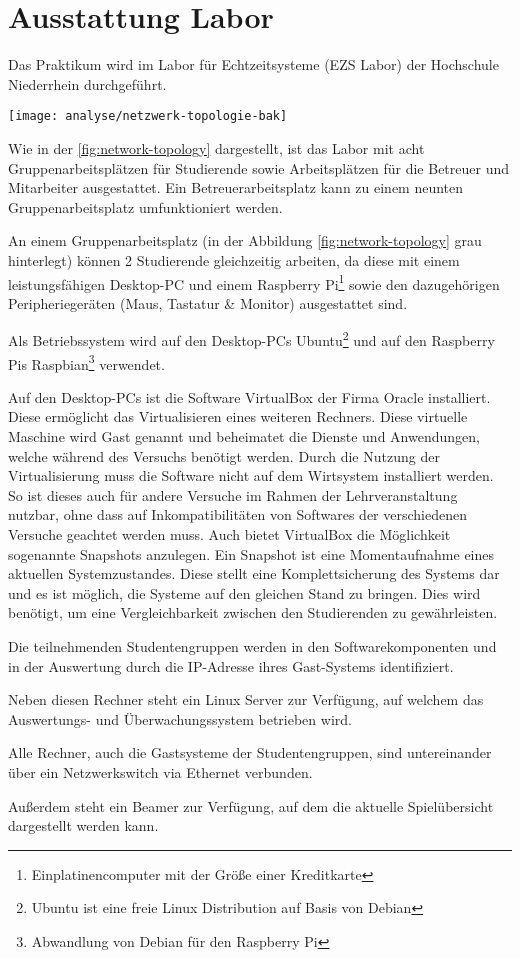 \section{Ausstattung Labor}
\label{sec:Ausstattung_Labor}

Das Praktikum wird im Labor für Echtzeitsysteme (EZS Labor) der Hochschule Niederrhein durchgeführt.

\begin{center}
	\texttt{[image: analyse/netzwerk-topologie-bak]}
	\label{fig:network-topology}
\end{center}

Wie in der \autoref{fig:network-topology} dargestellt, ist das Labor mit acht Gruppenarbeitsplätzen für Studierende sowie Arbeitsplätzen für die Betreuer und Mitarbeiter ausgestattet. Ein Betreuerarbeitsplatz kann zu einem neunten Gruppenarbeitsplatz umfunktioniert werden.

An einem Gruppenarbeitsplatz (in der Abbildung \ref{fig:network-topology} grau hinterlegt) können 2 Studierende gleichzeitig arbeiten, da diese mit einem leistungsfähigen Desktop-PC und einem Raspberry Pi\footnote{Einplatinencomputer mit der Größe einer Kreditkarte} sowie den dazugehörigen Peripheriegeräten (Maus, Tastatur \& Monitor) ausgestattet sind.

Als Betriebssystem wird auf den Desktop-PCs Ubuntu\footnote{Ubuntu ist eine freie Linux Distribution auf Basis von Debian} und auf den Raspberry Pis Raspbian\footnote{Abwandlung von Debian für den Raspberry Pi} verwendet.

Auf den Desktop-PCs ist die Software VirtualBox der Firma Oracle installiert. Diese ermöglicht das Virtualisieren eines weiteren Rechners. Diese virtuelle Maschine wird Gast genannt und beheimatet die Dienste und Anwendungen, welche während des Versuchs benötigt werden. Durch die Nutzung der Virtualisierung muss die Software nicht auf dem Wirtsystem installiert werden. So ist dieses auch für andere Versuche im Rahmen der Lehrveranstaltung nutzbar, ohne dass auf Inkompatibilitäten von Softwares der verschiedenen Versuche geachtet werden muss. Auch bietet VirtualBox die Möglichkeit sogenannte Snapshots anzulegen. Ein Snapshot ist eine Momentaufnahme eines aktuellen Systemzustandes. Diese stellt eine Komplettsicherung des Systems dar und es ist möglich, die Systeme auf den gleichen Stand zu bringen. \cite{oraclecorporationOracleVMVirtualBox2020} Dies wird benötigt, um eine Vergleichbarkeit zwischen den Studierenden zu gewährleisten.

Die teilnehmenden Studentengruppen werden in den Softwarekomponenten und in der Auswertung durch die IP-Adresse ihres Gast-Systems identifiziert.

Neben diesen Rechner steht ein Linux Server zur Verfügung, auf welchem das Auswertungs- und Überwachungssystem betrieben wird.

Alle Rechner, auch die Gastsysteme der Studentengruppen, sind untereinander über ein Netzwerkswitch via Ethernet verbunden.

Außerdem steht ein Beamer zur Verfügung, auf dem die aktuelle Spielübersicht dargestellt werden kann.